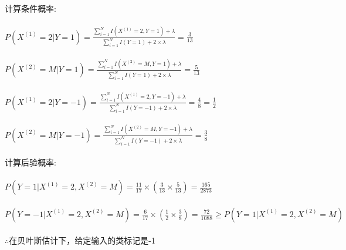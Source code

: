 \documentclass[]{article}
\begin{document}
计算条件概率:\\\\
$P(X^{(1)}=2|Y=1)=\frac{\sum_{i=1}^{N}I(X^{(1)}=2,Y=1)+\lambda}{\sum_{i=1}^{N}I(Y=1)+2\times\lambda}=\frac{3}{13}$\\\\
$P(X^{(2)}=M|Y=1)=\frac{\sum_{i=1}^{N}I(X^{(2)}=M,Y=1)+\lambda}{\sum_{i=1}^{N}I(Y=1)+2\times\lambda}=\frac{5}{13}$\\\\
$P(X^{(1)}=2|Y=-1)=\frac{\sum_{i=1}^{N}I(X^{(1)}=2,Y=-1)+\lambda}{\sum_{i=1}^{N}I(Y=-1)+2\times\lambda}=\frac{4}{8}=\frac{1}{2}$\\\\
$P(X^{(2)}=M|Y=-1)=\frac{\sum_{i=1}^{N}I(X^{(2)}=M,Y=-1)+\lambda}{\sum_{i=1}^{N}I(Y=-1)+2\times\lambda}=\frac{3}{8}$\\\\
计算后验概率:\\\\
$P(Y=1|X^{(1)}=2,X^{(2)}=M)=\frac{11}{17}\times(\frac{3}{13}\times\frac{5}{13})=\frac{165}{2873}$\\\\
$P(Y=-1|X^{(1)}=2,X^{(2)}=M)=\frac{6}{17}\times(\frac{1}{2}\times\frac{3}{8})=\frac{72}{1088}\geq P(Y=1|X^{(1)}=2,X^{(2)}=M)$\\\\
$\therefore$在贝叶斯估计下，给定输入的类标记是-1
\end{document}
